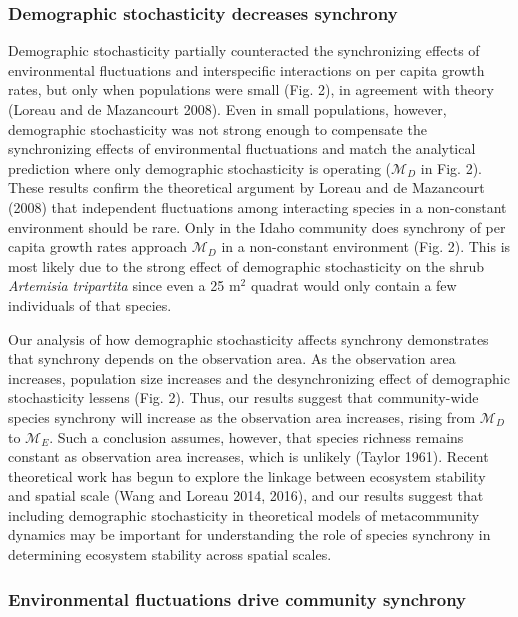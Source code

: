 \documentclass[12pt,]{article}
\begin{document}
\subsubsection{Demographic stochasticity decreases
synchrony}\label{demographic-stochasticity-decreases-synchrony}

Demographic stochasticity partially counteracted the synchronizing
effects of environmental fluctuations and interspecific interactions on
per capita growth rates, but only when populations were small (Fig. 2),
in agreement with theory (Loreau and {{de Mazancourt}} 2008). Even in
small populations, however, demographic stochasticity was not strong
enough to compensate the synchronizing effects of environmental
fluctuations and match the analytical prediction where only demographic
stochasticity is operating (\(\mathcal{M}_D\) in Fig. 2). These results
confirm the theoretical argument by Loreau and {{de Mazancourt}} (2008)
that independent fluctuations among interacting species in a
non-constant environment should be rare. Only in the Idaho community
does synchrony of per capita growth rates approach \(\mathcal{M}_D\) in
a non-constant environment (Fig. 2). This is most likely due to the
strong effect of demographic stochasticity on the shrub \emph{Artemisia
tripartita} since even a 25 \(\text{m}^2\) quadrat would only contain a
few individuals of that species.

Our analysis of how demographic stochasticity affects synchrony
demonstrates that synchrony depends on the observation area. As the
observation area increases, population size increases and the
desynchronizing effect of demographic stochasticity lessens (Fig. 2).
Thus, our results suggest that community-wide species synchrony will
increase as the observation area increases, rising from
\(\mathcal{M}_D\) to \(\mathcal{M}_E\). Such a conclusion assumes,
however, that species richness remains constant as observation area
increases, which is unlikely (Taylor 1961). Recent theoretical work has
begun to explore the linkage between ecosystem stability and spatial
scale (Wang and Loreau 2014, 2016), and our results suggest that
including demographic stochasticity in theoretical models of
metacommunity dynamics may be important for understanding the role of
species synchrony in determining ecosystem stability across spatial
scales.

\subsubsection{Environmental fluctuations drive community
synchrony}\label{environmental-fluctuations-drive-community-synchrony}
\end{document}

